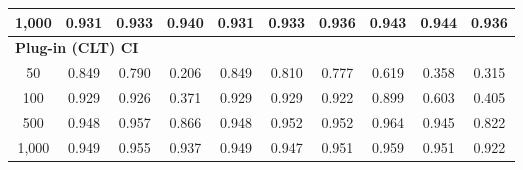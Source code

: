 \documentclass{article}
\numberwithin{equation}{section}
\begin{document}
\begin{table}[ht]
\begin{tabular}{c|ccc|cccccc}
1{,}000
& \cellcolor{covheat!91!white}0.931 & \cellcolor{covheat!92!white}0.933 & \cellcolor{covheat!95!white}0.940
& \cellcolor{covheat!91!white}0.931 & \cellcolor{covheat!92!white}0.933 & \cellcolor{covheat!93!white}0.936 & \cellcolor{covheat!96!white}0.943 & \cellcolor{covheat!97!white}0.944 & \cellcolor{covheat!93!white}0.936 \\
\hline
\multicolumn{10}{l}{\textbf{Plug-in (CLT) CI}} \\ \hline
50
& \cellcolor{covheat!50!white}0.849 & \cellcolor{covheat!20!white}0.790 & 0.206
& \cellcolor{covheat!50!white}0.849 & \cellcolor{covheat!30!white}0.810 & \cellcolor{covheat!14!white}0.777 & 0.619 & 0.358 & 0.315 \\
100
& \cellcolor{covheat!90!white}0.929 & \cellcolor{covheat!88!white}0.926 & 0.371
& \cellcolor{covheat!90!white}0.929 & \cellcolor{covheat!90!white}0.929 & \cellcolor{covheat!86!white}0.922 & \cellcolor{covheat!75!white}0.899 & 0.603 & 0.405 \\
500
& \cellcolor{covheat!99!white}0.948 & \cellcolor{covheat!100!white}0.957 & \cellcolor{covheat!58!white}0.866
& \cellcolor{covheat!99!white}0.948 & \cellcolor{covheat!100!white}0.952 & \cellcolor{covheat!100!white}0.952 & \cellcolor{covheat!100!white}0.964 & \cellcolor{covheat!98!white}0.945 & \cellcolor{covheat!36!white}0.822 \\
1{,}000
& \cellcolor{covheat!100!white}0.949 & \cellcolor{covheat!100!white}0.955 & \cellcolor{covheat!94!white}0.937
& \cellcolor{covheat!100!white}0.949 & \cellcolor{covheat!98!white}0.947 & \cellcolor{covheat!100!white}0.951 & \cellcolor{covheat!100!white}0.959 & \cellcolor{covheat!100!white}0.951 & \cellcolor{covheat!86!white}0.922 \\
\hline
\end{tabular}
\end{table}
\end{document}
